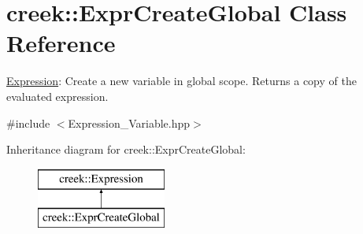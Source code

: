 \hypertarget{classcreek_1_1_expr_create_global}{}\section{creek\+:\+:Expr\+Create\+Global Class Reference}
\label{classcreek_1_1_expr_create_global}


\hyperlink{classcreek_1_1_expression}{Expression}\+: Create a new variable in global scope. Returns a copy of the evaluated expression.  




{\ttfamily \#include $<$Expression\+\_\+\+Variable.\+hpp$>$}

Inheritance diagram for creek\+:\+:Expr\+Create\+Global\+:\begin{figure}[H]
\begin{center}
\leavevmode
\includegraphics[height=2.000000cm]{classcreek_1_1_expr_create_global}
\end{center}
\end{figure}
